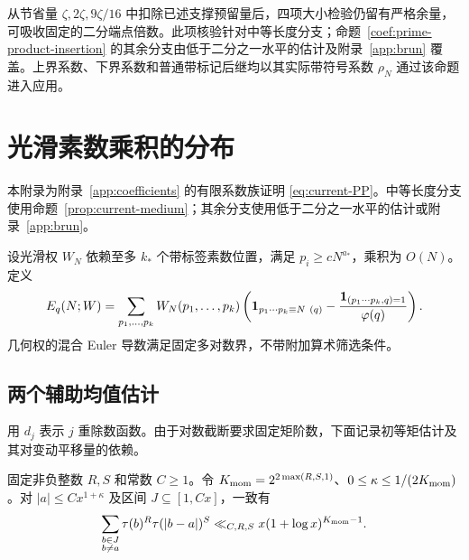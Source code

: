 从节省量 $\zeta,2\zeta,9\zeta/16$ 中扣除已述支撑预留量后，四项大小检验仍留有严格余量，可吸收固定的二分端点倍数。此项核验针对中等长度分支；命题~\ref{coef:prime-product-insertion} 的其余分支由低于二分之一水平的估计及附录~\ref{app:brun} 覆盖。上界系数、下界系数和普通带标记后继均以其实际带符号系数 $\rho_N$ 通过该命题进入应用。

\section{光滑素数乘积的分布}
\label{app:prime-products}

本附录为附录~\ref{app:coefficients} 的有限系数族证明 \eqref{eq:current-PP}。中等长度分支使用命题~\ref{prop:current-medium}；其余分支使用低于二分之一水平的估计或附录~\ref{app:brun}。

设光滑权 $W_N$ 依赖至多 $k_*$ 个带标签素数位置，满足 $p_i\ge cN^{a_*}$，乘积为 $O(N)$。定义
\[
 E_q(N;W)=\sum_{p_1,\ldots,p_k}W_N(p_1,\ldots,p_k)
 \left(\mathbf 1_{p_1\cdots p_k\equiv N\ (q)}
       -\frac{\mathbf 1_{(p_1\cdots p_k,q)=1}}{\varphi(q)}\right).
\]
几何权的混合 Euler 导数满足固定多对数界，不带附加算术筛选条件。

\subsection{两个辅助均值估计}

用 $d_j$ 表示 $j$ 重除数函数。由于对数截断要求固定矩阶数，下面记录初等矩估计及其对变动平移量的依赖。

\begin{lemma}\label{coef:mixed-moment}
固定非负整数 $R,S$ 和常数 $C\ge1$。令 $K_{\rm mom}=2^{2\max(R,S,1)}$、$0\le\kappa\le1/(2K_{\rm mom})$。对 $|a|\le Cx^{1+\kappa}$ 及区间 $J\subseteq[1,Cx]$，一致有
\[
 \sum_{\substack{b\in J\\b\ne a}}
       \tau(b)^R\tau(|b-a|)^S
 \ll_{C,R,S} x(1+\log x)^{K_{\rm mom}-1}.
\]
\end{lemma}

